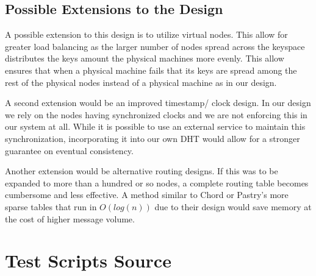 \documentclass[11pt]{article}
\begin{document}
\subsection{Possible Extensions to the Design}

A possible extension to this design is to utilize virtual nodes. This allow for greater load balancing as the larger number of nodes spread across the keyspace distributes the keys amount the physical machines more evenly. This allow ensures that when a physical machine fails that its keys are spread among the rest of the physical nodes instead of a physical machine as in our design.

A second extension would be an improved timestamp/ clock design. In our design we rely on the nodes having synchronized clocks and we are not enforcing this in our system at all. While it is possible to use an external service to maintain this synchronization, incorporating it into our own DHT would allow for a stronger guarantee on eventual consistency.

Another extension would be alternative routing designs. If this was to be expanded to more than a hundred or so nodes, a complete routing table becomes cumbersome and less effective. A method similar to Chord or Pastry's more sparse tables that run in $O(log(n))$ due to their design would save memory at the cost of higher message volume.

\clearpage

\printbibliography

\clearpage

\appendix

\section{Test Scripts Source}
\end{document}
